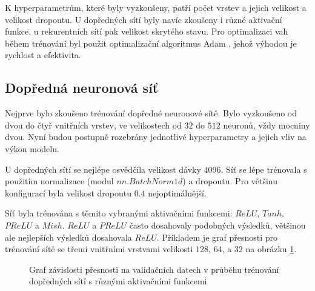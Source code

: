 K hyperparametrům, které byly vyzkoušeny, patří počet vrstev a jejich velikost a
velikost dropoutu. U dopředných sítí byly navíc zkoušeny i různé aktivační
funkce, u rekurentních sítí pak velikost skrytého stavu. Pro optimalizaci vah
během trénování byl použit optimalizační algoritmus Adam \cite{adam}, jehož
výhodou je rychlost a efektivita.

\subsection{Dopředná neuronová síť}

Nejprve bylo zkoušeno trénování dopředné neuronové sítě. Bylo vyzkoušeno od dvou do
čtyř vnitřních vrstev, ve velikostech od $32$ do $512$ neuronů, vždy mocniny
dvou. Nyní budou postupně rozebrány jednotlivé hyperparametry a jejich vliv na
výkon modelu.

U dopředných sítí se nejlépe osvědčila velikost dávky $4096$. Síť se lépe
trénovala s použitím normalizace (modul $nn.BatchNorm1d$) a dropoutu. Pro
většinu konfigurací byla velikost dropoutu $0.4$ nejoptimálnější.

Síť byla trénována s těmito vybranými aktivačními funkcemi: $ReLU$, $Tanh$,
$PReLU$ a $Mish$. $ReLU$ a $PReLU$ často dosahovaly podobných výsledků,
většinou ale nejlepších výsledků dosahovala $ReLU$. Příkladem je graf přesnosti
pro trénování sítě se třemi vnitřními vrstvami velikosti $128$, $64$, a $32$ na
obrázku \ref{graph:fnnactivations}.

\begin{figure}[]
    \centering
    \caption{Graf závislosti přesnosti na validačních datech v průběhu trénování dopředných sítí s různými aktivačními funkcemi}
    \label{graph:fnnactivations}
\end{figure}

